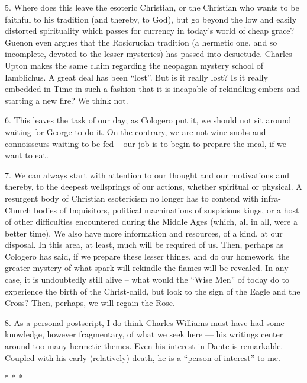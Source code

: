 5. Where does this leave the esoteric Christian, or the Christian who wants to be faithful to his tradition (and thereby, to God), but go beyond the low and easily distorted spirituality which passes for currency in today's world of cheap grace? Guenon even argues that the Rosicrucian tradition (a hermetic one, and so incomplete, devoted to the lesser mysteries) has passed into desuetude. Charles Upton makes the same claim regarding the neopagan mystery school of Iamblichus. A great deal has been ``lost''. But is it really lost? Is it really embedded in Time in such a fashion that it is incapable of rekindling embers and starting a new fire? We think not.

6. This leaves the task of our day; as Cologero put it, we should not sit around waiting for George to do it. On the contrary, we are not wine-snobs and connoisseurs waiting to be fed -- our job is to begin to prepare the meal, if we want to eat.

7. We can always start with attention to our thought and our motivations and thereby, to the deepest wellsprings of our actions, whether spiritual or physical. A resurgent body of Christian esotericism no longer has to contend with infra-Church bodies of Inquisitors, political machinations of suspicious kings, or a host of other difficulties encountered during the Middle Ages (which, all in all, were a better time). We also have more information and resources, of a kind, at our disposal. In this area, at least, much will be required of us. Then, perhaps as Cologero has said, if we prepare these lesser things, and do our homework, the greater mystery of what spark will rekindle the flames will be revealed. In any case, it is undoubtedly still alive -- what would the ``Wise Men'' of today do to experience the birth of the Christ-child, but look to the sign of the Eagle and the Cross? Then, perhaps, we will regain the Rose.

8. As a personal postscript, I do think Charles Williams must have had some knowledge, however fragmentary, of what we seek here --- his writings center around too many hermetic themes. Even his interest in Dante is remarkable. Coupled with his early (relatively) death, he is a ``person of interest'' to me.



\begin{center}* * *\end{center}

